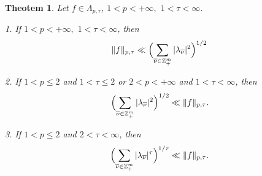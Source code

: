 \documentclass[12pt]{article}
\def\leq {\leqslant}
\theoremstyle{plain}
\newtheorem{theorem}{Theotem}[section]
\begin{document}
\begin{theorem}\label{th3.1}
Let $f \in \Lambda_{p ,\tau}$, $1 < p < +\infty,$ $1< \tau< \infty$.

1. If  $1 < p < +\infty,$ $1< \tau< \infty$, then 
\begin{equation*}
\|f\|_{p, \tau}\ll \Bigl(\sum_{\overline{\nu} \in \mathbb{Z}_{+}^{m}}|\lambda_{\overline{\nu}}|^{2}\Bigr)^{1/2}
\end{equation*}


2. If $1 < p \leq 2$ and $1< \tau \leq 2$ or  $2< p< +\infty$ and $1< \tau< \infty$, then
\begin{equation*}
\Bigl(\sum_{\overline{\nu} \in \mathbb{Z}_{+}^{m}}|\lambda_{\overline{\nu}}|^{2}\Bigr)^{1/2}\ll \|f\|_{p, \tau}. 
\end{equation*}

3. If $1 < p \leq 2$ and $2< \tau < \infty$, then
\begin{equation*}
\Bigl(\sum_{\overline{\nu} \in \mathbb{Z}_{+}^{m}}|\lambda_{\overline{\nu}}|^{\tau}\Bigr)^{1/\tau}\ll \|f\|_{p, \tau}. 
\end{equation*}
\end{theorem}
\end{document}
